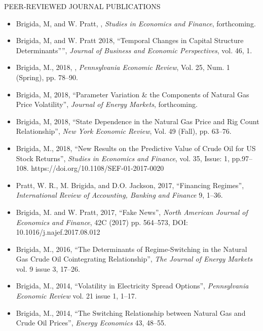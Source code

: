 \documentclass[9pt]{article}
\begin{document}
\vspace{10pt}
PEER-REVIEWED JOURNAL PUBLICATIONS
\begin{itemize}[noitemsep, nolistsep]
\item Brigida, M, and W. Pratt, \href{https://papers.ssrn.com/sol3/papers.cfm?abstract_id=2848527}{\color{Blue}{High-Frequency Trading and Market Efficiency: Evidence from the Weekly Natural Gas Storage Report}}, {\it Studies in Economics and Finance}, forthcoming.
\item Brigida, M, and W. Pratt 2018, ``Temporal Changes in Capital Structure Determinants”'', {\it Journal of Business and Economic Perspectives}, vol. 46, 1.
\item Brigida, M., 2018, \href{http://www.econpea.org/pub/PER2018Issue25no1.pdf}{\color{Blue}{``Causes of Asymmetric Volatility in Oil Futures''}}, {\it Pennsylvania Economic Review\/}, Vol. 25, Num. 1 (Spring), pp. 78--90.
\item Brigida, M, 2018, ``Parameter Variation \& the Components of Natural Gas Price Volatility'', {\it Journal of Energy Markets}, forthcoming.
\item Brigida, M, 2018, ``State Dependence in the Natural Gas Price and Rig Count Relationship'', {\it New York Economic Review}, Vol. 49 (Fall), pp. 63--76.
\item Brigida, M., 2018, ``New Results on the Predictive Value of Crude Oil for US Stock Returns'', {\it Studies in Economics and Finance}, vol. 35, Issue: 1, pp.97--108. https://doi.org/10.1108/SEF-01-2017-0020
\item Pratt, W. R., M. Brigida, and D.O. Jackson, 2017, ``Financing Regimes'', {\it International Review of Accounting, Banking and Finance} 9, 1--36. \href{http://www.irabf.org/publication/Financing Regimes.pdf}{\color{Blue}{http://www.irabf.org/publication/Financing Regimes.pdf}}
\item Brigida, M. and W. Pratt, 2017, ``Fake News'', {\it North American Journal of Economics and Finance\/}, 42C (2017) pp. 564--573, DOI: 10.1016/j.najef.2017.08.012
\item Brigida, M., 2016, ``The Determinants of Regime-Switching in the Natural Gas Crude Oil Cointegrating Relationship'', {\it The Journal of Energy Markets} vol. 9 issue 3, 17--26.
\item Brigida, M., 2014, ``Volatility in Electricity Spread Options'', {\it Pennsylvania Economic Review} vol. 21 issue 1, 1--17.
\item Brigida, M., 2014, ``The Switching Relationship between Natural Gas and Crude Oil Prices'', {\it Energy Economics\/} 43, 48--55.  

\end{itemize}
\end{document}
